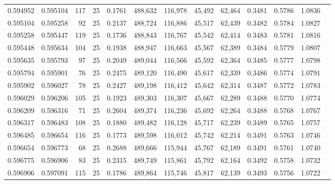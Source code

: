 \begin{tabular}{rrrrrrrrrrrrr}
0.594952 & 0.595104 &   117 &  25 &                                     0.1761 & 488,632 & 116,978 &  45,492 &  62,464 & 0.3481 & 0.5786 & 1.0836 \\
0.595104 & 0.595258 &    92 &  25 &                                     0.2137 & 488,724 & 116,886 &  45,517 &  62,439 & 0.3482 & 0.5784 & 1.0827 \\
0.595258 & 0.595447 &   119 &  25 &                                     0.1736 & 488,843 & 116,767 &  45,542 &  62,414 & 0.3483 & 0.5781 & 1.0816 \\
0.595448 & 0.595634 &   104 &  25 &                                     0.1938 & 488,947 & 116,663 &  45,567 &  62,389 & 0.3484 & 0.5779 & 1.0807 \\
0.595635 & 0.595793 &    97 &  25 &                                     0.2049 & 489,044 & 116,566 &  45,592 &  62,364 & 0.3485 & 0.5777 & 1.0798 \\
0.595794 & 0.595901 &    76 &  25 &                                     0.2475 & 489,120 & 116,490 &  45,617 &  62,339 & 0.3486 & 0.5774 & 1.0791 \\
0.595902 & 0.596027 &    78 &  25 &                                     0.2427 & 489,198 & 116,412 &  45,642 &  62,314 & 0.3487 & 0.5772 & 1.0783 \\
0.596029 & 0.596206 &   105 &  25 &                                     0.1923 & 489,303 & 116,307 &  45,667 &  62,289 & 0.3488 & 0.5770 & 1.0774 \\
0.596209 & 0.596316 &    71 &  25 &                                     0.2604 & 489,374 & 116,236 &  45,692 &  62,264 & 0.3488 & 0.5768 & 1.0767 \\
0.596317 & 0.596483 &   108 &  25 &                                     0.1880 & 489,482 & 116,128 &  45,717 &  62,239 & 0.3489 & 0.5765 & 1.0757 \\
0.596485 & 0.596654 &   116 &  25 &                                     0.1773 & 489,598 & 116,012 &  45,742 &  62,214 & 0.3491 & 0.5763 & 1.0746 \\
0.596654 & 0.596773 &    68 &  25 &                                     0.2688 & 489,666 & 115,944 &  45,767 &  62,189 & 0.3491 & 0.5761 & 1.0740 \\
0.596775 & 0.596906 &    83 &  25 &                                     0.2315 & 489,749 & 115,861 &  45,792 &  62,164 & 0.3492 & 0.5758 & 1.0732 \\
0.596906 & 0.597091 &   115 &  25 &                                     0.1786 & 489,864 & 115,746 &  45,817 &  62,139 & 0.3493 & 0.5756 & 1.0722 \\

\end{tabular}
